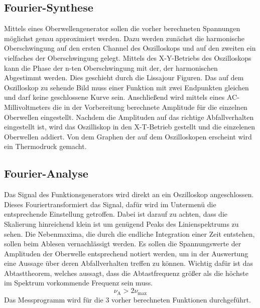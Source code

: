 \subsection{Fourier-Synthese}
Mittels eines Oberwellengenerator sollen die vorher berechneten Spannungen möglichst genau approximiert werden. Dazu werden zunächst die harmonische Oberschwingung auf den ersten Channel des Oszilloskops und auf den zweiten ein vielfaches der Oberschwingung gelegt. Mittels des X-Y-Betriebs des Oszilloskops kann die Phase der n-ten Oberschwingung mit der, der harmonischen Abgestimmt werden. Dies geschieht durch die Lissajour Figuren. Das auf dem Oszilloskop zu sehende Bild muss einer Funktion mit zwei Endpunkten gleichen und darf keine geschlossene Kurve sein. Anschließend wird mittels eines AC-Millivoltmeters die in der Vorbereitung berechnete Amplitude für die einzelnen Oberwellen eingestellt. Nachdem die Amplituden auf das richtige Abfallverhalten eingestellt ist, wird das Oszilliskop in den X-T-Betrieb gestellt und die einzelenen Oberwellen addiert. Von dem Graphen der auf dem Oszilloskopen erscheint wird ein Thermodruck gemacht.
\subsection{Fourier-Analyse}
Das Signal des Funktionsgenerators wird direkt an ein Oszilloskop angeschlossen. Dieses Fouriertransformiert das Signal, dafür wird im Untermenü die entsprechende Einstellung getroffen. Dabei ist darauf zu achten, dass die Skalierung hinreichend klein ist um genügend Peaks des Linienspektrums zu sehen. Die Nebenmaxima, die durch die endliche Integration einer Zeit entstehen, sollen beim Ablesen vernachlässigt werden. Es sollen die Spannungswerte der Amplituden der Oberwelle entsprechend notiert werden, um in der Auswertung eine Aussage über deren Abfallverhalten treffen zu können. Wichtig dafür ist das Abtasttheorem, welches aussagt, dass die Abtastfrequenz größer als die höchste im Spektrum vorkommende Frequenz sein muss.
\begin{equation*}
  \nu_\text{A} > 2 \nu_\text{max}
\end{equation*}
Das Messprogramm wird für die 3 vorher berechneten Funktionen durchgeführt.
